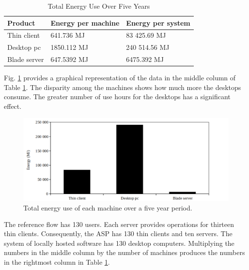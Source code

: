 \documentclass[final,journal,10pt,letterpaper,oneside,twocolumn,compsoc]%
{IEEEtran}
\begin{document}
\begin{table}[t!]
  \caption{Total Energy Use Over Five Years}
  \label{tab:7}
  \centering
    \begin{tabular}{|l|l|l|}
    \hline
    Product      & Energy per machine & Energy per system \\
    \hline
    Thin client  & 641.736 MJ         & 83 425.69 MJ \\
    Desktop pc   & 1850.112 MJ        & 240 514.56 MJ \\
    Blade server & 647.5392 MJ        & 6475.392 MJ \\
    \hline
    \end{tabular}
\end{table}

Fig. \ref{fig:tab1} provides a graphical representation of the data in the
middle column of Table \ref{tab:7}. The disparity among the machines shows how
much more the desktops consume. The greater number of use hours for the desktops
has a significant effect.

\begin{figure}[t!]
  \centering
    \includegraphics[scale=0.425]{total_energy_use_over_five_years}
  \caption{Total energy use of each machine over a five year period.}
  \label{fig:tab1}
\end{figure}

The reference flow has 130 users. Each server provides operations for thirteen
thin
clients. Consequently, the ASP has 130 thin clients and ten servers. The system
of locally hosted software has 130 desktop computers. Multiplying the numbers in
the middle column by the number of machines produces the numbers in the
rightmost column in Table \ref{tab:7}.
\end{document}
